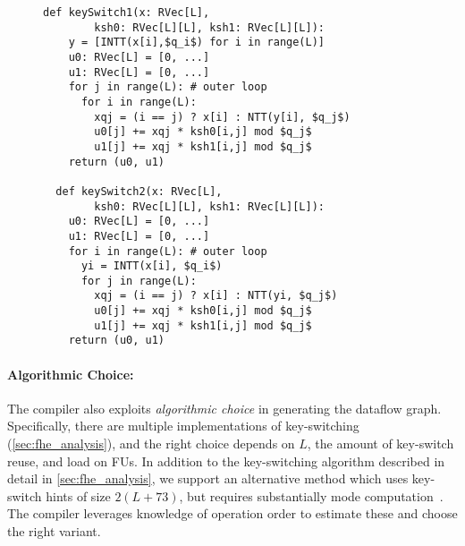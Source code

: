 \begin{figure}
\begin{center}
  \begin{lstlisting}[caption={Key-switch implementation. \texttt{RVec} is an $N$-element vector of 32-bit values, storing a single RNS polynomial in either the coefficient or the NTT domain. %Inputs and outputs are in the NTT domain. 
    %RVec[L] is a vector of L RNS polynomials representing a full ciphertext polynomial; RVec[L][L] is an L$\times$L matrix. + and * operations on RVec are element-wise and modular.
    }, mathescape=true, style=custompython, label=listing:translations]
  def keySwitch1(x: RVec[L], 
        ksh0: RVec[L][L], ksh1: RVec[L][L]):
    y = [INTT(x[i],$q_i$) for i in range(L)]
    u0: RVec[L] = [0, ...]
    u1: RVec[L] = [0, ...]
    for j in range(L): # outer loop
      for i in range(L):
        xqj = (i == j) ? x[i] : NTT(y[i], $q_j$)
        u0[j] += xqj * ksh0[i,j] mod $q_j$
        u1[j] += xqj * ksh1[i,j] mod $q_j$
    return (u0, u1)

  def keySwitch2(x: RVec[L], 
        ksh0: RVec[L][L], ksh1: RVec[L][L]):
    u0: RVec[L] = [0, ...]
    u1: RVec[L] = [0, ...]
    for i in range(L): # outer loop
      yi = INTT(x[i], $q_i$)
      for j in range(L):
        xqj = (i == j) ? x[i] : NTT(yi, $q_j$)
        u0[j] += xqj * ksh0[i,j] mod $q_j$
        u1[j] += xqj * ksh1[i,j] mod $q_j$
    return (u0, u1)
  \end{lstlisting}
\end{center}
\end{figure}

\paragraph{Algorithmic Choice:} The compiler also exploits \emph{algorithmic choice} in generating the dataflow graph.
Specifically, there are multiple implementations of key-switching (\autoref{sec:fhe_analysis}),
and the right choice depends on $L$, the amount of key-switch reuse,
and load on FUs. In addition to the key-switching algorithm described in detail in \autoref{sec:fhe_analysis}, we support
an alternative method which uses key-switch hints of size $2(L + 73)$, but requires substantially mode computation~\cite{gentry:crypto2012:homomorphic}.
The compiler leverages knowledge of operation order to estimate these and choose the right variant.

